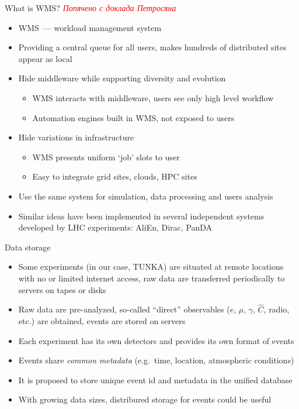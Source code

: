 \documentclass[18pt]{beamer}
\begin{document}
\begin{frame}{What is WMS?}
\textcolor{red}{\textit{Попячено с доклада Петросяна}}
\begin{itemize}
  \item WMS~--- workload management system
  \item Providing a central queue for all users, makes hundreds of distributed sites appear as local
  \item Hide middleware while supporting diversity and evolution
  \begin{itemize}
    \item WMS interacts with middleware, users see only high level workflow
    \item Automation engines built in WMS, not exposed to users
  \end{itemize}
  \item Hide variations in infrastructure
  \begin{itemize}
    \item WMS presents uniform ‘job’ slots to user
    \item Easy to integrate grid sites, clouds, HPC sites
  \end{itemize}
  \item Use the same system for simulation, data processing and users analysis
  \item Similar ideas have been implemented in several independent systems developed by LHC experiments: AliEn, Dirac, PanDA
\end{itemize}
\end{frame}

\begin{frame}{Data storage}
\begin{itemize}
  \item Some experiments (in our case, TUNKA) are situated at remote locations with no or limited internet access, raw data are transferred periodically to servers on tapes or disks
  \item Raw data are pre-analyzed, so-called ``direct'' observables ($e$, $\mu$, $\gamma$, $\hat{C}$, radio, etc.) are obtained, events are stored on servers
  \item Each experiment has its own detectors and provides its own format of events
  \item Events share \emph{common metadata} (e.g.\ time, location, atmospheric conditions)
  \item It is proposed to store unique event id and metadata in the unified database
  \item With growing data sizes, distribured storage for events could be useful
\end{itemize}
\end{frame}
\end{document}
